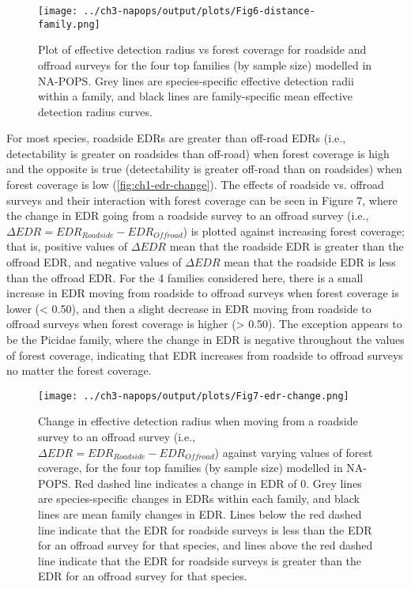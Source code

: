 \begin{figure}[h]
	\centering
	\texttt{[image: ../ch3-napops/output/plots/Fig6-distance-family.png]}
	\caption{\label{fig:ch1-distance-family}Plot of effective detection radius vs forest coverage for roadside and offroad surveys for the four top families (by sample size) modelled in NA-POPS. Grey lines are species-specific effective detection radii within a family, and black lines are family-specific mean effective detection radius curves.}
\end{figure}

\par For most species, roadside EDRs are greater than off-road EDRs (i.e., detectability is greater on roadsides than off-road) when forest coverage is high and the opposite is true (detectability is greater off-road than on roadsides) when forest coverage is low (\autoref{fig:ch1-edr-change}). The effects of roadside vs. offroad surveys and their interaction with forest coverage can be seen in Figure 7, where the change in EDR going from a roadside survey to an offroad survey (i.e., $\Delta EDR = EDR_{Roadside} - EDR_{Offroad}$) is plotted against increasing forest coverage; that is, positive values of $\Delta EDR$ mean that the roadside EDR is greater than the offroad EDR, and negative values of $\Delta EDR$ mean that the roadside EDR is less than the offroad EDR. For the 4 families considered here, there is a small increase in EDR moving from roadside to offroad surveys when forest coverage is lower (< 0.50), and then a slight decrease in EDR moving from roadside to offroad surveys when forest coverage is higher (> 0.50). The exception appears to be the Picidae family, where the change in EDR is negative throughout the values of forest coverage, indicating that EDR increases from roadside to offroad surveys no matter the forest coverage.

\begin{figure}[h]
	\centering
	\texttt{[image: ../ch3-napops/output/plots/Fig7-edr-change.png]}
	\caption{\label{fig:ch1-edr-change}Change in effective detection radius when moving from a roadside survey to an offroad survey (i.e., $\Delta EDR = EDR_{Roadside} - EDR_{Offroad}$) against varying values of forest coverage, for the four top families (by sample size) modelled in NA-POPS. Red dashed line indicates a change in EDR of 0. Grey lines are species-specific changes in EDRs within each family, and black lines are mean family changes in EDR. Lines below the red dashed line indicate that the EDR for roadside surveys is less than the EDR for an offroad survey for that species, and lines above the red dashed line indicate that the EDR for roadside surveys is greater than the EDR for an offroad survey for that species.}
\end{figure}

